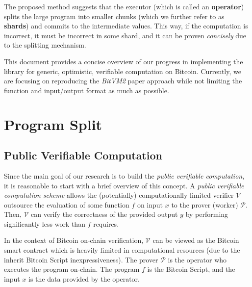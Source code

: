 \documentclass{iacrtrans}
\begin{document}
The proposed method suggests that the executor (which is called an
\textbf{operator}) splits the large program into smaller chunks (which we
further refer to as \textbf{shards}) and commits to the intermediate values.
This way, if the computation is incorrect, it must be incorrect in some shard,
and it can be proven \textit{concisely} due to the splitting mechanism.

This document provides a concise overview of our progress in implementing the
library for generic, optimistic, verifiable computation on Bitcoin. Currently,
we are focusing on reproducing the \textit{BitVM2} paper approach
while not limiting the
function and input/output format as much as possible.

\section{Program Split}\label{sec:program-splitting}

\subsection{Public Verifiable Computation}

Since the main goal of our research is to build the \textit{public verifiable
computation}, it is reasonable to start with a brief overview of this concept. A
\textit{public verifiable computation scheme} allows the (potentially)
computationally limited verifier $\mathcal{V}$ outsource the evaluation of some
function $f$ on input $x$ to the prover (worker) $\mathcal{P}$. Then,
$\mathcal{V}$ can verify the correctness of the provided output $y$ by
performing significantly less work than $f$ requires.

In the context of Bitcoin on-chain verification, $\mathcal{V}$ can be viewed as
the Bitcoin smart contract which is heavily limited in computational resources
(due to the inherit Bitcoin Script inexpressiveness). The prover $\mathcal{P}$
is the operator who executes the program on-chain. The program $f$ is the
Bitcoin Script, and the input $x$ is the data provided by the operator.
\end{document}

